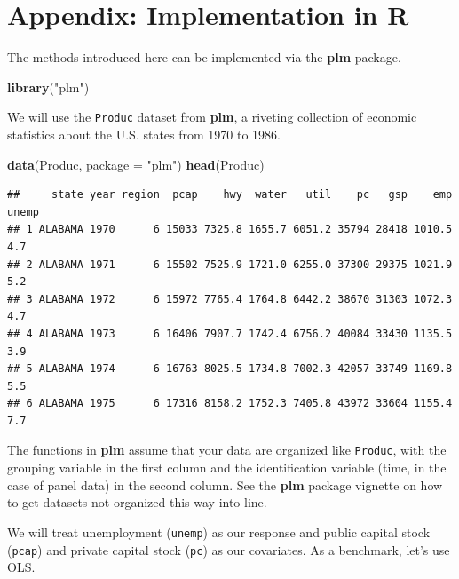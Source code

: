 \documentclass[12pt,oneside,openany]{book}
\newenvironment{Shaded}{\begin{snugshade}}{\end{snugshade}}
\newcommand{\KeywordTok}[1]{\textcolor[rgb]{0.13,0.29,0.53}{\textbf{#1}}}
\newcommand{\DataTypeTok}[1]{\textcolor[rgb]{0.13,0.29,0.53}{#1}}
\newcommand{\StringTok}[1]{\textcolor[rgb]{0.31,0.60,0.02}{#1}}
\newcommand{\NormalTok}[1]{#1}
\begin{document}
\section{Appendix: Implementation in
R}\label{appendix-implementation-in-r-1}

The methods introduced here can be implemented via the \textbf{plm}
package.

\begin{Shaded}
\begin{Highlighting}[]
\KeywordTok{library}\NormalTok{(}\StringTok{"plm"}\NormalTok{)}
\end{Highlighting}
\end{Shaded}

We will use the \texttt{Produc} dataset from \textbf{plm}, a riveting
collection of economic statistics about the U.S. states from 1970 to
1986.

\begin{Shaded}
\begin{Highlighting}[]
\KeywordTok{data}\NormalTok{(Produc, }\DataTypeTok{package =} \StringTok{"plm"}\NormalTok{)}
\KeywordTok{head}\NormalTok{(Produc)}
\end{Highlighting}
\end{Shaded}

\begin{verbatim}
##     state year region  pcap    hwy  water   util    pc   gsp    emp unemp
## 1 ALABAMA 1970      6 15033 7325.8 1655.7 6051.2 35794 28418 1010.5   4.7
## 2 ALABAMA 1971      6 15502 7525.9 1721.0 6255.0 37300 29375 1021.9   5.2
## 3 ALABAMA 1972      6 15972 7765.4 1764.8 6442.2 38670 31303 1072.3   4.7
## 4 ALABAMA 1973      6 16406 7907.7 1742.4 6756.2 40084 33430 1135.5   3.9
## 5 ALABAMA 1974      6 16763 8025.5 1734.8 7002.3 42057 33749 1169.8   5.5
## 6 ALABAMA 1975      6 17316 8158.2 1752.3 7405.8 43972 33604 1155.4   7.7
\end{verbatim}

The functions in \textbf{plm} assume that your data are organized like
\texttt{Produc}, with the grouping variable in the first column and the
identification variable (time, in the case of panel data) in the second
column. See the \textbf{plm} package vignette on how to get datasets not
organized this way into line.

We will treat unemployment (\texttt{unemp}) as our response and public
capital stock (\texttt{pcap}) and private capital stock (\texttt{pc}) as
our covariates. As a benchmark, let's use OLS.
\end{document}
